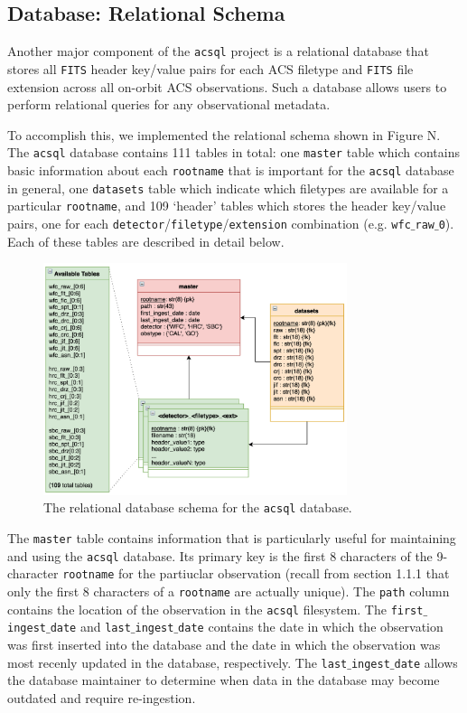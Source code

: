 \documentclass[10pt,journal,compsoc]{IEEEtran}
\begin{document}
\subsection{Database: Relational Schema}

Another major component of the \texttt{acsql} project is a relational database
that stores all \texttt{FITS} header key/value pairs for each ACS filetype and
\texttt{FITS} file extension across all on-orbit ACS observations.  Such a
database allows users to perform relational queries for any observational
metadata.

To accomplish this, we implemented the relational schema shown in Figure N.  The
\texttt{acsql} database contains 111 tables in total: one \texttt{master} table
which contains basic information about each \texttt{rootname} that is important
for the \texttt{acsql} database in general, one \texttt{datasets} table which
indicate which filetypes are available for a particular \texttt{rootname}, and
109 `header' tables which stores the header key/value pairs, one for each
\texttt{detector}/\texttt{filetype}/\texttt{extension} combination (e.g.
\texttt{wfc$\_$raw$\_$0}).  Each of these tables are described in detail below.

\begin{figure}[!t]
\centering
\includegraphics[width=3.5in]{./figures/schema.png}
\caption{The relational database schema for the \texttt{acsql} database.}
\label{fig1}
\end{figure}

The \texttt{master} table contains information that is particularly useful
for maintaining and using the \texttt{acsql} database.  Its primary key is
the first 8 characters of the 9-character \texttt{rootname} for the partiuclar
observation (recall from section 1.1.1 that only the first 8 characters of
a \texttt{rootname} are actually unique).  The \texttt{path} column contains
the location of the observation in the \texttt{acsql} filesystem.  The
\texttt{first$\_$ingest$\_$date} and \texttt{last$\_$ingest$\_$date} contains the date
in which the observation was first inserted into the database and the date
in which the observation was most recenly updated in the database, respectively.
The \texttt{last$\_$ingest$\_$date} allows the database maintainer to determine when
data in the database may become outdated and require re-ingestion.
\end{document}
